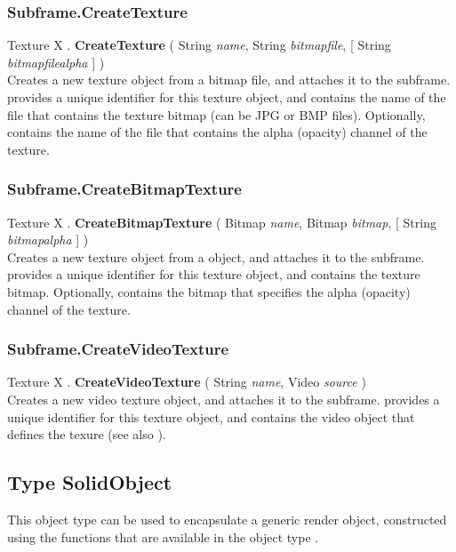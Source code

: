 \subsubsection{Subframe.CreateTexture \label{F:Subframe:CreateTexture}}
Texture X . \textbf{CreateTexture} ( String \textit{name}, String \textit{bitmapfile},  [ String \textit{bitmapfilealpha} ] ) \\
Creates a new texture object from a bitmap file, and attaches it to the subframe.  provides a unique identifier for this texture object, and  contains the name of the file that contains the texture bitmap (can be JPG or BMP files). Optionally,  contains the name of the file that contains the alpha (opacity) channel of the texture.

\subsubsection{Subframe.CreateBitmapTexture \label{F:Subframe:CreateBitmapTexture}}
Texture X . \textbf{CreateBitmapTexture} ( Bitmap \textit{name}, Bitmap \textit{bitmap},  [ String \textit{bitmapalpha} ] ) \\
Creates a new texture object from a  object, and attaches it to the subframe.  provides a unique identifier for this texture object, and  contains the texture bitmap. Optionally,  contains the bitmap that specifies the alpha (opacity) channel of the texture.


\subsubsection{Subframe.CreateVideoTexture \label{F:Subframe:CreateVideoTexture}}
Texture X . \textbf{CreateVideoTexture} ( String \textit{name}, Video \textit{source} ) \\
Creates a new video texture object, and attaches it to the subframe.  provides a unique identifier for this texture object, and  contains the video object that defines the texure (see also ).


\subsection{Type SolidObject \label{T:SolidObject}}
This object type can be used to encapsulate a generic render object, constructed using the functions that are available in the object type .


